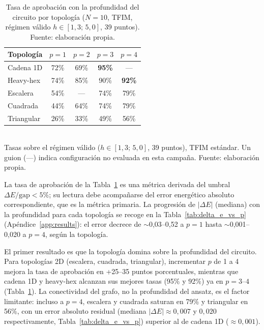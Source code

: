 \documentclass[11pt,a4paper,spanish]{book}
\begin{document}
\begin{table}[h]
\centering
\caption[Tasa de aprobación frente a la profundidad por topología]{Tasa de aprobación con la profundidad del circuito por topología ($N = 10$, TFIM, régimen válido $h \in [1{,}3;\, 5{,}0]$, 39 puntos). Fuente: elaboración propia.}
\label{tab:cross_topo_depth}
\begin{tabular}{lcccc}
\toprule
\textbf{Topología} & \textbf{$p = 1$} & \textbf{$p = 2$} & \textbf{$p = 3$} & \textbf{$p = 4$} \\
\midrule
Cadena 1D & 72\% & 69\% & \textbf{95\%} & --- \\
Heavy-hex & 74\% & 85\% & 90\% & \textbf{92\%} \\
Escalera & 54\% & --- & 74\% & 79\% \\
Cuadrada & 44\% & 64\% & 74\% & 79\% \\
Triangular & 26\% & 33\% & 49\% & 56\% \\
\bottomrule
\end{tabular}
\\[2pt]
\footnotesize Tasas sobre el régimen válido ($h \in [1{,}3;\, 5{,}0]$, 39 puntos), TFIM estándar. Un guion (---) indica configuración no evaluada en esta campaña. Fuente: elaboración propia.
\end{table}

La tasa de aprobación de la Tabla~\ref{tab:cross_topo_depth} es una métrica derivada del umbral $\Delta E/\text{gap} < 5\%$; su lectura debe acompañarse del error energético absoluto correspondiente, que es la métrica primaria. La progresión de $|\Delta E|$ (mediana) con la profundidad para cada topología se recoge en la Tabla~\ref{tab:delta_e_vs_p} (Apéndice~\ref{app:results}): el error decrece de $\sim$0,03--0,52 a $p=1$ hasta $\sim$0,001--0,020 a $p=4$, según la topología.

El primer resultado es que la topología domina sobre la profundidad del circuito. Para topologías 2D (escalera, cuadrada, triangular), incrementar $p$ de 1 a 4 mejora la tasa de aprobación en +25--35 puntos porcentuales, mientras que cadena 1D y heavy-hex alcanzan sus mejores tasas (95\% y 92\%) ya en $p = 3$--$4$ (Tabla~\ref{tab:cross_topo_depth}). La conectividad del grafo, no la profundidad del ansatz, es el factor limitante: incluso a $p = 4$, escalera y cuadrada saturan en 79\% y triangular en 56\%, con un error absoluto residual (mediana $|\Delta E| \approx 0,007$ y $0,020$ respectivamente, Tabla~\ref{tab:delta_e_vs_p}) superior al de cadena 1D ($\approx 0,001$).
\end{document}

